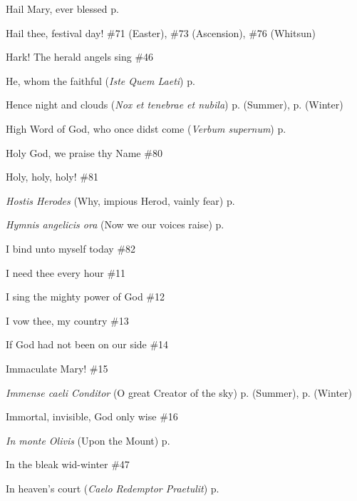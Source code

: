 \begin{hangparas}{1.25em}{1}
\par\noindent
Hail Mary, ever blessed \dotfill p. \pageref{WalsinghamEvensong}
\par\noindent
Hail thee, festival day! \dotfill \#71 (Easter), \#73 (Ascension), \#76 (Whitsun)
\par\noindent
Hark! The herald angels sing \dotfill \#46
\par\noindent
He, whom the faithful (\textit{Iste Quem Laeti}) \dotfill p. \pageref{JosephMattins}
\par\noindent
Hence night and clouds (\textit{Nox et tenebrae et nubila}) \dotfill p. \pageref{WednesdayMattinsSummer} (Summer), p. \pageref{WednesdayMattinsWinter} (Winter)
\par\noindent
High Word of God, who once didst come (\textit{Verbum supernum}) \dotfill p. \pageref{FirstAdventInvitatory}
\par\noindent
Holy God, we praise thy Name \dotfill \#80
\par\noindent
Holy, holy, holy!  \dotfill \#81
\par\noindent
\textit{Hostis Herodes} (Why, impious Herod, vainly fear) \dotfill p. \pageref{EpiphanyEvensong}
\par\noindent
\textit{Hymnis angelicis ora} (Now we our voices raise) \dotfill p. \pageref{ScholasticaInvitatory}
\par\noindent
I bind unto myself today \dotfill \#82
\par\noindent
I need thee every hour \dotfill \#11
\par\noindent
I sing the mighty power of God \dotfill \#12
\par\noindent
I vow thee, my country \dotfill \#13
\par\noindent
If God had not been on our side \dotfill \#14
\par\noindent
Immaculate Mary! \dotfill \#15
\par\noindent
\textit{Immense caeli Conditor} (O great Creator of the sky) \dotfill p. \pageref{MondayEvensongSummer} (Summer), p. \pageref{MondayEvensongWinter} (Winter)
\par\noindent
Immortal, invisible, God only wise \dotfill \#16
\par\noindent
\textit{In monte Olivis} (Upon the Mount) \dotfill p. \pageref{HolyRosaryInvitatory}
\par\noindent
In the bleak wid-winter \dotfill \#47
\par\noindent
In heaven's court (\textit{Caelo Redemptor Praetulit}) \dotfill p. \pageref{MotherhoodInvitatory}

\end{hangparas}
